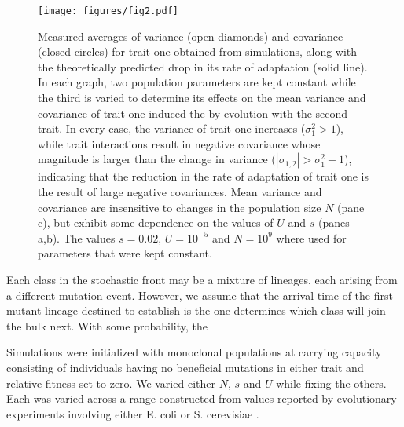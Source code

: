 \documentclass[9pt,twocolumn,twoside]{gsajnl}
\begin{document}
\begin{figure*}[!ht]
\centering
\texttt{[image: figures/fig2.pdf]} 
\caption{Measured averages of variance (open diamonds) and covariance (closed circles) for trait one obtained from simulations, along with the theoretically predicted drop in its rate of adaptation (solid line). In each graph, two population parameters are kept constant while the third is varied to determine its effects on the mean variance and covariance of trait one induced the by evolution with the second trait.  In every case, the variance of trait one increases ($\sigma_1^2 >1$), while trait interactions result in negative covariance whose magnitude is larger than the change in variance ($|\sigma_{1,2}| > \sigma_1^2-1$), indicating that the reduction in the rate of adaptation of trait one is the result of large negative covariances.  Mean variance and covariance are insensitive to changes in the population size $N$ (pane c), but exhibit some dependence on the values of $U$ and $s$ (panes a,b). The values  $s=0.02$, $U=10^{-5}$ and $N=10^9$ where used for parameters that were kept constant.}\label{fig:2}
\end{figure*}

Each class in the stochastic front may be a mixture of lineages, each arising from a different mutation event. However, we assume that the arrival time of the first mutant lineage destined to establish is the one determines which class will join the bulk next. With some probability, the  \par
% 
% 

Simulations were initialized with monoclonal populations at carrying capacity consisting of individuals having no beneficial mutations in either trait and relative fitness set to zero. We varied either $N$, $s$ and $U$ while fixing the others. Each was varied across a range constructed from values reported by evolutionary experiments involving either E. coli or S. cerevisiae \citep{desai2007speed,Levy2015,Perfeito2007}.  \par
% 
% 
% 
%
\end{document}

